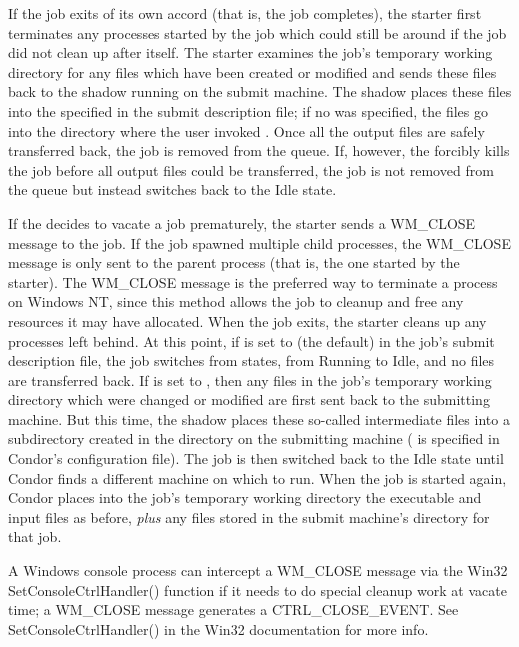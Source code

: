 If the job exits of its own accord (that is, the job completes),
the starter
first terminates any processes started by the job which could still be
around if the job did not clean up after itself.
The starter examines the job's temporary working directory for any
files which have been created or modified and sends these files back
to the shadow running on the submit machine.
The shadow
places these files into the  specified in the
submit description file; if no  was specified, the files go
into the directory where the user invoked .
Once all the output files are safely transferred back,
the job is removed from the queue.
If, however, the  forcibly kills the job before all output files
could be transferred, the job is not removed from the queue but instead
switches back to the Idle state.  

If the  decides to vacate a job prematurely,
the starter sends a WM\_CLOSE message to the job.
If the job spawned multiple child processes, the WM\_CLOSE message is only
sent to the parent process (that is, the one started by the starter).
The
WM\_CLOSE message is the preferred way to terminate a process on Windows NT,
since this method allows the job to cleanup and free any resources it may
have allocated.
When the job exits, the starter cleans up any processes left behind.
At this point, if  is set to
 (the default) in the job's submit description file,
the job switches from states, from Running to Idle,
and no files are transferred back.
If  is set to , then any files
in the job's temporary working directory which were changed or modified are
first sent back to the submitting machine.
But this time, the shadow places these
so-called intermediate files into a subdirectory created in the
 directory on the submitting machine
( is specified in Condor's configuration file).
The job is then switched back to the Idle state until Condor finds
a different machine on which to run.
When the job is started again,
Condor places into the job's temporary working directory the executable
and input files as before,
\emph{plus} any files stored in the submit machine's  directory for that job.  

\Note A Windows console process can intercept a WM\_CLOSE message
via the Win32 SetConsoleCtrlHandler() function if it needs to do special
cleanup work at vacate time; a WM\_CLOSE message
generates a CTRL\_CLOSE\_EVENT.  See SetConsoleCtrlHandler() in the Win32
documentation for more info.

